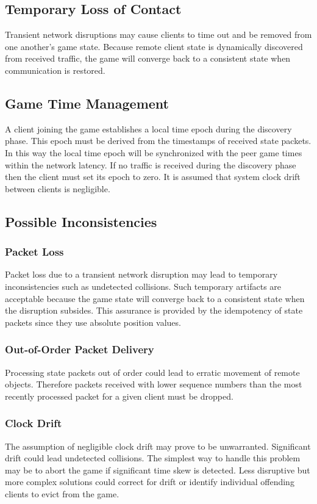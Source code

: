 \documentclass{article}
\begin{document}
\subsection{Temporary Loss of Contact}
Transient network disruptions may cause clients to time out and be
removed from one another's game state.   Because remote client state
is dynamically discovered from received traffic, the game will converge
back to a consistent state when communication is restored.

\subsection{Game Time Management}
\label{ssec:gametime}
A client joining the game establishes a local time epoch during the
discovery phase.  This epoch must be derived from the timestamps of
received state packets.  In this way the local time epoch will be
synchronized with the peer game times within the network latency.  If no
traffic is received during the discovery phase then the client must set
its epoch to zero.  It is assumed that system clock drift between
clients is negligible.

\subsection{Possible Inconsistencies}

\subsubsection{Packet Loss}
Packet loss due to a transient network disruption may lead to temporary
inconsistencies such as undetected collisions.  Such temporary artifacts
are acceptable because the game state will converge back to a consistent
state when the disruption subsides.  This assurance is provided by the
idempotency of state packets since they use absolute position values.

\subsubsection{Out-of-Order Packet Delivery}
Processing state packets out of order could lead to erratic movement of
remote objects.  Therefore packets received with lower sequence numbers
than the most recently processed packet for a given client must be
dropped.

\subsubsection{Clock Drift}
The assumption of negligible clock drift may prove to be unwarranted.
Significant drift could lead undetected collisions.  The simplest way to
handle this problem may be to abort the game if significant time skew is
detected.  Less disruptive but more complex solutions could correct for
drift or identify individual offending clients to evict from the game.
\end{document}
